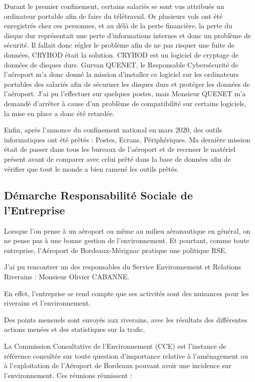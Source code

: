 Durant le premier confinement, certains salariés se sont vus attribués un ordinateur portable afin de faire du télétravail. Or plusieurs vols ont été enregistrés chez ces personnes, et au délà de la perte financière, la perte du disque dur représentait une perte d'informations internes et donc un problème de sécurité.
Il fallait donc régler le problème afin de ne pas risquer une fuite de données, CRYHOD était la solution. CRYHOD est un logiciel de cryptage de données de disques durs.
Gurvan QUENET, le Responsable Cybersécurité de l'aéroport m'a donc donné la mission d'installer ce logiciel sur les ordinateurs portables des salariés afin de sécuriser les disques durs et protéger les données de l'aéroport.
J'ai pu l'effectuer sur quelques postes, mais Monsieur QUENET m'a demandé d'arrêter à cause d'un problème de compatibilité sur certains logiciels, la mise en place a donc été retardée.\newline

Enfin, après l'annonce du confinement national en mars 2020, des outils informatiques ont été prêtés : Postes, Ecrans, Périphériques.
Ma dernière mission était de passer dans tous les bureaux de l'aéroport et de recenser le matériel présent avant de comparer avec celui prêté dans la base de données afin de vérifier que tout le monde a bien ramené les outils prêtés.

\newpage

\subsection{Démarche Responsabilité Sociale de l’Entreprise}


Lorsque l'on pense à un aéroport ou même au milieu aéronautique en général, on ne pense pas à une bonne gestion de l'environnement.
Et pourtant, comme toute entreprise, l'Aéroport de Bordeaux-Mérignac pratique une politique RSE.

J'ai pu rencontrer un des responsables du Service Environnement et Relations Riverains : Monsieur Olivier CABANNE.

En effet, l'entreprise se rend compte que ses activités sont des nuisances pour les riverains et l'environnement. 

Des points mensuels sont envoyés aux riverains, avec les résultats des différentes actions menées et des statistiques sur la trafic.

La Commission Consultative de l’Environnement (CCE) est l’instance de référence consultée sur toute question d’importance relative à l’aménagement ou à l’exploitation de l’Aéroport de Bordeaux pouvant avoir une incidence sur l’environnement. Ces réunions réunissent : 

